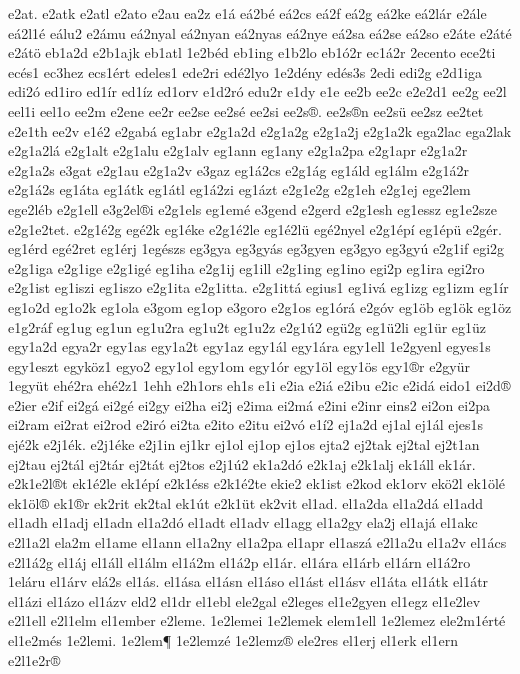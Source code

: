 {e2at.
e2atk
e2atl
e2ato
e2au
ea2z
e1á
eá2bé
eá2cs
eá2f
eá2g
eá2ke
eá2lár
e2ále
eá2l1é
eálu2
e2ámu
eá2nyal
eá2nyan
eá2nyas
eá2nye
eá2sa
eá2se
eá2so
e2áte
e2áté
e2átö
eb1a2d
e2b1ajk
eb1atl
1e2béd
eb1ing
e1b2lo
eb1ó2r
ec1á2r
2ecento
ece2ti
ecés1
ec3hez
ecs1ért
edeles1
ede2ri
edé2lyo
1e2dény
edés3s
2edi
edi2g
e2d1iga
edi2ó
ed1iro
ed1ír
ed1íz
ed1orv
e1d2ró
edu2r
e1dy
e1e
ee2b
ee2c
e2e2d1
ee2g
ee2l
eel1i
eel1o
ee2m
e2ene
ee2r
ee2se
ee2sé
ee2si
ee2s®.
ee2s®n
ee2sü
ee2sz
ee2tet
e2e1th
ee2v
e1é2
e2gabá
eg1abr
e2g1a2d
e2g1a2g
e2g1a2j
e2g1a2k
ega2lac
ega2lak
e2g1a2lá
e2g1alt
e2g1alu
e2g1alv
eg1ann
eg1any
e2g1a2pa
e2g1apr
e2g1a2r
e2g1a2s
e3gat
e2g1au
e2g1a2v
e3gaz
eg1á2cs
e2g1ág
eg1áld
eg1álm
e2g1á2r
e2g1á2s
eg1áta
eg1átk
eg1átl
eg1á2zi
eg1ázt
e2g1e2g
e2g1eh
e2g1ej
ege2lem
ege2léb
e2g1ell
e3g2el®i
e2g1els
eg1emé
e3gend
e2gerd
e2g1esh
eg1essz
eg1e2sze
e2g1e2tet.
e2g1é2g
egé2k
eg1éke
e2g1é2le
eg1é2lü
egé2nyel
e2g1épí
eg1épü
e2gér.
eg1érd
egé2ret
eg1érj
1egészs
eg3gya
eg3gyás
eg3gyen
eg3gyo
eg3gyú
e2g1if
egi2g
e2g1iga
e2g1ige
e2g1igé
eg1iha
e2g1ij
eg1ill
e2g1ing
eg1ino
egi2p
eg1ira
egi2ro
e2g1ist
eg1iszi
eg1iszo
e2g1ita
e2g1itta.
e2g1ittá
egius1
eg1ivá
eg1izg
eg1izm
eg1ír
eg1o2d
eg1o2k
eg1ola
e3gom
eg1op
e3goro
e2g1os
eg1órá
e2góv
eg1öb
eg1ök
eg1öz
e1g2ráf
eg1ug
eg1un
eg1u2ra
eg1u2t
eg1u2z
e2g1ú2
egü2g
eg1ü2li
eg1ür
eg1üz
egy1a2d
egya2r
egy1as
egy1a2t
egy1az
egy1ál
egy1ára
egy1ell
1e2gyenl
egyes1s
egy1eszt
egyköz1
egyo2
egy1ol
egy1om
egy1ór
egy1öl
egy1ös
egy1®r
e2gyür
1együt
ehé2ra
ehé2z1
1ehh
e2h1ors
eh1s
e1i
e2ia
e2iá
e2ibu
e2ic
e2idá
eido1
ei2d®
e2ier
e2if
ei2gá
ei2gé
ei2gy
ei2ha
ei2j
e2ima
ei2má
e2ini
e2inr
eins2
ei2on
ei2pa
ei2ram
ei2rat
ei2rod
e2iró
ei2ta
e2ito
e2itu
ei2vó
e1í2
ej1a2d
ej1al
ej1ál
ejes1s
ejé2k
e2j1ék.
e2j1éke
e2j1in
ej1kr
ej1ol
ej1op
ej1os
ejta2
ej2tak
ej2tal
ej2t1an
ej2tau
ej2tál
ej2tár
ej2tát
ej2tos
e2j1ú2
ek1a2dó
e2k1aj
e2k1alj
ek1áll
ek1ár.
e2k1e2l®t
ek1é2le
ek1épí
e2k1éss
e2k1é2te
ekie2
ek1ist
e2kod
ek1orv
ekö2l
ek1ölé
ek1öl®
ek1®r
ek2rit
ek2tal
ek1út
e2k1üt
ek2vit
el1ad.
el1a2da
el1a2dá
el1add
el1adh
el1adj
el1adn
el1a2dó
el1adt
el1adv
el1agg
el1a2gy
ela2j
el1ajá
el1akc
e2l1a2l
ela2m
el1ame
el1ann
el1a2ny
el1a2pa
el1apr
el1aszá
e2l1a2u
el1a2v
el1ács
e2l1á2g
el1áj
el1áll
el1álm
el1á2m
el1á2p
el1ár.
el1ára
el1árb
el1árn
el1á2ro
1eláru
el1árv
elá2s
el1ás.
el1ása
el1ásn
el1áso
el1ást
el1ásv
el1áta
el1átk
el1átr
el1ázi
el1ázo
el1ázv
eld2
el1dr
el1ebl
ele2gal
e2leges
el1e2gyen
el1egz
el1e2lev
e2l1ell
e2l1elm
el1ember
e2leme.
1e2lemei
1e2lemek
elem1ell
1e2lemez
ele2m1érté
el1e2més
1e2lemi.
1e2lem¶
1e2lemzé
1e2lemz®
ele2res
el1erj
el1erk
el1ern
e2l1e2r®
}
